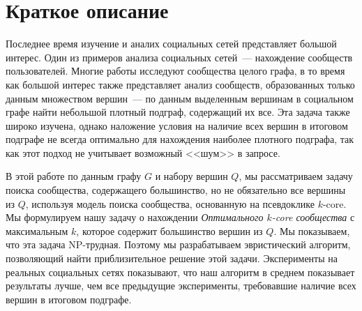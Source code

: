 \startprefacepage

\section{Краткое описание}

Последнее время изучение и аналих социальных сетей представляет большой интерес. 
Один из примеров анализа социальных сетей~--- нахождение сообществ пользователей. 
Многие работы исследуют сообщества целого графа, в то время как большой интерес также представляет анализ сообществ, 
образованных только данным множеством вершин~--- по данным выделенным вершинам в социальном графе найти небольшой плотный подграф, содержащий их все. Эта задача также широко изучена, однако наложение условия на наличие всех вершин в итоговом подграфе не всегда оптимально для нахождения наиболее плотного подграфа, так как этот подход не учитывает возможный <<шум>> в запросе. 

В этой работе по данным графу $G$ и набору вершин $Q$, мы рассматриваем задачу поиска сообщества, содержащего большинство, но не обязательно все вершины из $Q$, используя модель поиска сообщества, основанную на псевдоклике $k$-core. Мы формулируем нашу задачу о нахождении \textit{Оптимального $k$-core сообщества} с максимальным $k$, которое содержит большинство вершин из $Q$. Мы показываем, что эта задача NP-трудная. Поэтому мы разрабатываем эвристический алгоритм, позволяющий найти приблизительное решение этой задачи. Эксперименты на реальных социальных сетях показывают, что наш алгоритм в среднем показывает результаты лучше, чем все предыдущие эксперименты, требовавшие наличие всех вершин в итоговом подграфе.
